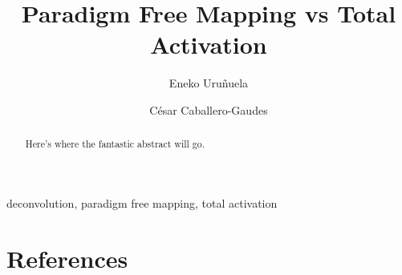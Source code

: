 \documentclass[5p]{elsarticle}
\begin{document}
\begin{frontmatter}

\title{Paradigm Free Mapping vs Total Activation}

\author[bcbl,upv]{Eneko Uru\~nuela}
\author[bcbl]{C\'{e}sar Caballero-Gaudes}

\address[bcbl]{Basque Center on Cognition, Brain and Language, Spain}
\address[upv]{University of the Basque Country, Spain}

\begin{abstract}
Here's where the fantastic abstract will go.
\end{abstract}

\begin{keyword}
deconvolution, paradigm free mapping, total activation
\end{keyword}

\end{frontmatter}

\linenumbers









\section*{References}


\end{document}
